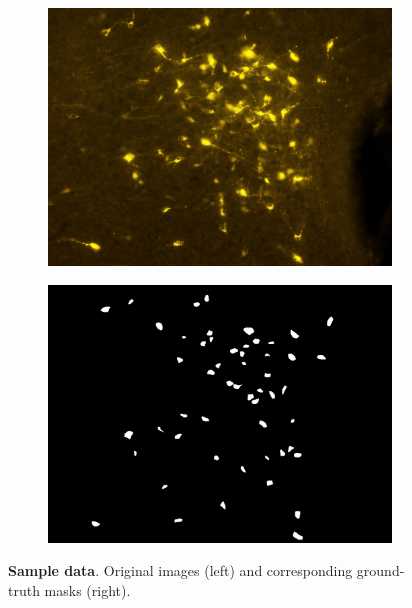\begin{figure}
\centering
\begin{subfigure}{0.5\textwidth}
\includegraphics[width=\linewidth]{figures/120_dataset/i_257.jpeg}
\subcaption{}
\end{subfigure}%
\begin{subfigure}{0.5\textwidth}
\includegraphics[width=\linewidth]{figures/120_dataset/m_257.png}
\subcaption{}
\label{fig:dataset:bright}
\end{subfigure}
\vspace{-0.2cm}
\caption{
\textbf{Sample data}. 
Original images (left) and corresponding ground-truth masks (right).
} \label{fig:dataset}
\end{figure}%
